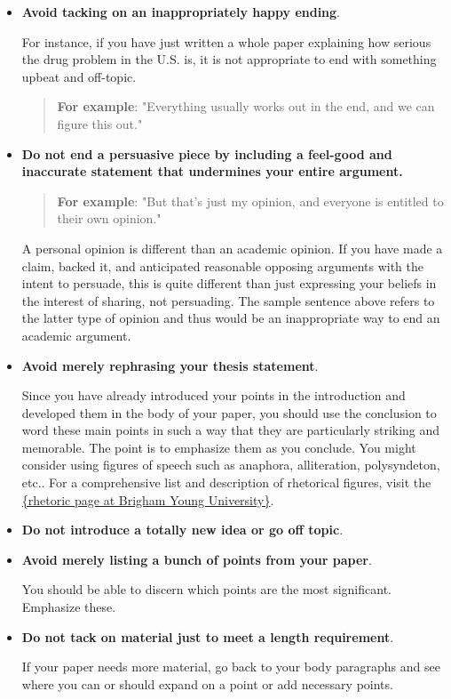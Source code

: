 \begin{itemize}        	
\item \textbf{Avoid tacking on an inappropriately happy ending}. 

For instance, if you have just written a whole paper explaining how serious the drug 
problem in the U.S. is, it is not appropriate to end with something  upbeat and 
off-topic.
 
\begin{quote} \textbf{For example}: "Everything usually works out in the end, and we 
can figure this out."
 
\end{quote}
 
\item \textbf{Do not end a persuasive piece by including a feel-good and inaccurate 
statement that undermines your entire argument.}

\begin{quote}
\textbf{For example}:
        	"But that's just my opinion, and everyone is entitled to their own opinion."
 \end{quote}
        	
A personal opinion is different than an academic opinion. If you have made a claim, 
backed it, and anticipated reasonable opposing arguments with the intent to persuade,
this is quite different than just expressing your beliefs in the interest of sharing, not
persuading. The sample sentence above refers to the latter type of opinion and thus 
would be an inappropriate way to end an academic argument.
 
\item \textbf{Avoid merely rephrasing your thesis statement}.

Since you have already introduced your points in the introduction and developed them 
in the body of your paper, you should use the conclusion to word these main points in 
such a way that they are particularly striking and memorable. The point is to emphasize 
them as you conclude. You might consider using figures of speech such as anaphora, 
alliteration, polysyndeton, etc.. For a comprehensive list and description of rhetorical 
figures, visit the \href{http://rhetoric.byu.edu}{\{rhetoric page at Brigham Young University\}}.
 
 
\item \textbf{Do not introduce a totally new idea or go off topic}.
 
\item \textbf{Avoid merely listing a bunch of points from your paper}.

You should be able to discern which points are the most significant. Emphasize these.
 
\item \textbf{Do not tack on material just to meet a length requirement}.

If your paper needs more material, go back to your body paragraphs and see where you 
can or should expand on a point or add necessary points.

\end{itemize}


